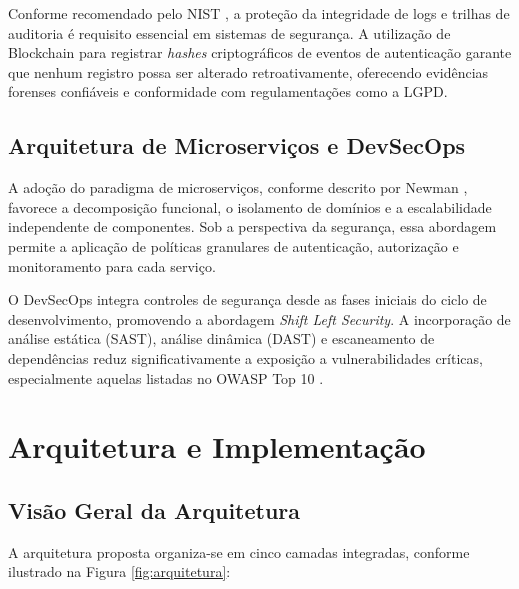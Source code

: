 \documentclass[12pt,a4paper]{article}
\begin{document}
Conforme recomendado pelo NIST \cite{nist2020}, a proteção da integridade de logs e trilhas de auditoria é requisito essencial em sistemas de segurança. A utilização de Blockchain para registrar \textit{hashes} criptográficos de eventos de autenticação garante que nenhum registro possa ser alterado retroativamente, oferecendo evidências forenses confiáveis e conformidade com regulamentações como a LGPD.

\subsection{Arquitetura de Microserviços e DevSecOps}

A adoção do paradigma de microserviços, conforme descrito por Newman \cite{newman2021}, favorece a decomposição funcional, o isolamento de domínios e a escalabilidade independente de componentes. Sob a perspectiva da segurança, essa abordagem permite a aplicação de políticas granulares de autenticação, autorização e monitoramento para cada serviço.

O DevSecOps integra controles de segurança desde as fases iniciais do ciclo de desenvolvimento, promovendo a abordagem \textit{Shift Left Security}. A incorporação de análise estática (SAST), análise dinâmica (DAST) e escaneamento de dependências reduz significativamente a exposição a vulnerabilidades críticas, especialmente aquelas listadas no OWASP Top 10 \cite{owasp2023}.

\section{Arquitetura e Implementação}

\subsection{Visão Geral da Arquitetura}

A arquitetura proposta organiza-se em cinco camadas integradas, conforme ilustrado na Figura \ref{fig:arquitetura}:
\end{document}
